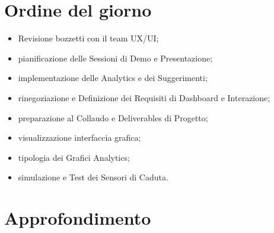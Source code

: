 \documentclass[10pt, letterpaper]{article}
\begin{document}
\makeTitlePage

\newpage

\tableofcontents

\newpage


\makeMeetingParticipantsTable

\section{Ordine del giorno}
\begin{itemize}
      \item Revisione bozzetti con il team UX/UI;
      \item pianificazione delle Sessioni di Demo e Presentazione;
      \item implementazione delle Analytics e dei Suggerimenti;
      \item rinegoziazione e Definizione dei Requisiti di Dashboard e Interazione;
      \item preparazione al Collaudo e Deliverables di Progetto;
      \item visualizzazione interfaccia grafica;
      \item tipologia dei Grafici Analytics;
      \item simulazione e Test dei Sensori di Caduta.
\end{itemize}

\section{Approfondimento}
\end{document}
